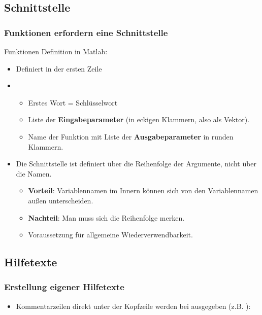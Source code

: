   \subsection{Schnittstelle}
  \begin{frame}
      \frametitle{Funktionen erfordern eine Schnittstelle}
      Funktionen Definition in Matlab:
      \begin{itemize}
        \item Definiert in der ersten Zeile
        \item {}
        \begin{itemize}
          \item Erstes Wort = Schlüsselwort 
          \item Liste der \textbf{Eingabeparameter} (in eckigen Klammern, also als Vektor).
          \item Name der Funktion mit Liste der \textbf{Ausgabeparameter} in runden Klammern.
        \end{itemize}
        \item Die Schnittstelle ist definiert über die Reihenfolge der Argumente, nicht über die Namen.
        \begin{itemize}
          \item \textbf{Vorteil}: Variablennamen im Innern können sich von den Variablennamen außen unterscheiden.
          \item \textbf{Nachteil}: Man muss sich die Reihenfolge merken.
          \item Voraussetzung für allgemeine Wiederverwendbarkeit.
        \end{itemize}
      \end{itemize}
  \end{frame}

  \subsection{Hilfetexte}
  \begin{frame}
      \frametitle{Erstellung eigener Hilfetexte}
      \begin{itemize}
        \item Kommentarzeilen direkt unter der Kopfzeile werden bei  ausgegeben
        (z.B. ):
        
      \end{itemize}
  \end{frame}


